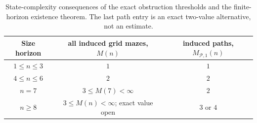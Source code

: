 \begin{table}[!htbp]
\centering\small
\begin{tabular}{@{}c|c|c@{}}
\toprule
Size horizon & all induced grid mazes, $M(n)$ & induced paths, $M_{\mathcal P,1}(n)$\\
\midrule
$1\le n\le3$ & $1$ & $1$\\
$4\le n\le6$ & $2$ & $2$\\
$n=7$ & $3\le M(7)<\infty$ & $2$\\
$n\ge8$ & $3\le M(n)<\infty$; exact value open & $3$ or $4$\\
\bottomrule
\end{tabular}
\caption{State-complexity consequences of the exact obstruction thresholds and the finite-horizon existence theorem.  The last path entry is an exact two-value alternative, not an estimate.}
\label{tab:state-complexity}
\end{table}

